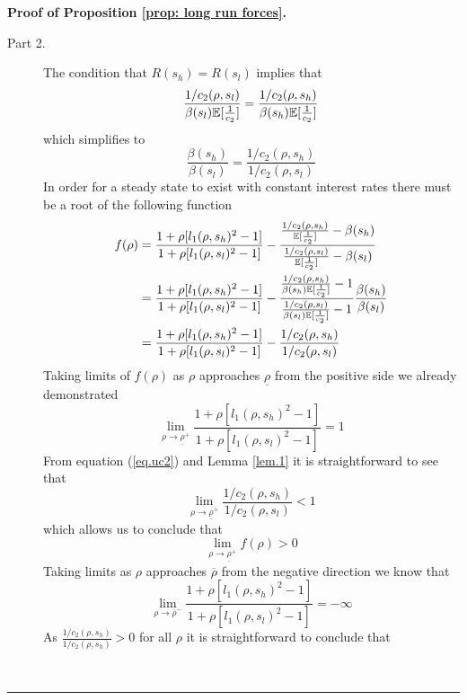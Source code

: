 \documentclass[thmsb,11pt]{article}
\newenvironment{proof}[1][Proof]{\noindent \textbf{#1.} }{\  \rule{0.5em}{0.5em}}
\begin{document}
\begin{proof}[Proof of Proposition \ref{prop: long run forces}]
\begin{description}
\item[Part 2.] The condition that $R(s_h) = R(s_l)$ implies that
\begin{equation*}
\frac{1/c_2(\rho,s_l)}{\beta(s_l)\mathbb{E}[\frac1{c_2}]} = \frac{%
1/c_2(\rho,s_h)}{\beta(s_h)\mathbb{E}[\frac1{c_2}]}
\end{equation*}%
which simplifies to
\begin{equation}
\frac{\beta(s_h)}{\beta(s_l)} = \frac{1/c_2(\rho,s_h)}{1/c_2(\rho,s_l)}
\end{equation}
In order for a steady state to exist with constant interest rates there must
be a root of the following function
\begin{align*}
f(\rho) &= \frac{1+\rho[l_1(\rho,s_h)^2-1]}{1+\rho[l_1(\rho,s_l)^2-1]}-\frac{%
\frac{1/c_2(\rho,s_h)}{\mathbb{E}[\frac1{c_2}]}-\beta(s_h) }{\frac{%
1/c_2(\rho,s_l)}{\mathbb{E}[\frac1{c_2}]}-\beta(s_l)} \\
&= \frac{1+\rho[l_1(\rho,s_h)^2-1]}{1+\rho[l_1(\rho,s_l)^2-1]}-\frac{\frac{%
1/c_2(\rho,s_h)}{\beta(s_h)\mathbb{E}[\frac1{c_2}]}-1 }{\frac{%
1/c_2(\rho,s_l)}{\beta(s_l)\mathbb{E}[\frac1{c_2}]}-1}\frac{\beta(s_h)%
}{\beta(s_l)} \\
& = \frac{1+\rho[l_1(\rho,s_h)^2-1]}{1+\rho[l_1(\rho,s_l)^2-1]}-\frac{%
1/c_2(\rho,s_h)}{1/c_2(\rho,s_l)}
\end{align*}
Taking limits of $f(\rho)$ as $\rho$ approaches $\underline\rho$ from the
positive side we already demonstrated
\begin{equation*}
\lim_{\rho\rightarrow\underline\rho^+}\frac{1+\rho[l_1(\rho,s_h)^2-1]}{1+\rho%
[l_1(\rho,s_l)^2-1]} = 1
\end{equation*}
From equation (\ref{eq.uc2}) and Lemma \ref{lem.1} it is straightforward to
see that
\begin{equation*}
\lim_{\rho\rightarrow\underline\rho^+}\frac{1/c_2(\rho,s_h)}{1/c_2(\rho,s_l)}
< 1
\end{equation*}
which allows us to conclude that
\begin{equation*}
\lim_{\rho\rightarrow\underline\rho^+} f(\rho) > 0
\end{equation*}
Taking limits as $\rho$ approaches $\overline\rho$ from the negative
direction we know that
\begin{equation*}
\lim_{\rho\rightarrow\overline\rho^-}\frac{1+\rho[l_1(\rho,s_h)^2-1]}{1+\rho[%
l_1(\rho,s_l)^2-1]} = -\infty
\end{equation*}
As $\frac{1/c_2(\rho,s_h)}{1/c_2(\rho,s_h)} > 0$ for all $\rho$ it is
straightforward to conclude that

\end{description}
\end{proof}
\end{document}
